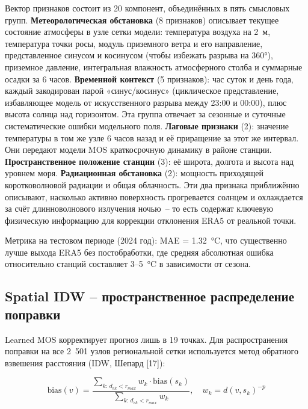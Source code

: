 \documentclass[14pt,a4paper]{extarticle}
\numberwithin{table}{section}
\numberwithin{figure}{section}
\numberwithin{equation}{section}
\begin{document}
Вектор признаков состоит из 20 компонент, объединённых в пять смысловых групп.
\textbf{Метеорологическая обстановка} (8 признаков) описывает текущее
состояние атмосферы в узле сетки модели: температура воздуха на 2~м,
температура точки росы, модуль приземного ветра и его направление,
представленное синусом и косинусом (чтобы избежать разрыва на 360°),
приземное давление, интегральная влажность атмосферного столба и
суммарные осадки за 6 часов.
\textbf{Временной контекст} (5 признаков): час суток и день года,
каждый закодирован парой «синус/косинус» (циклическое представление,
избавляющее модель от искусственного разрыва между 23:00 и 00:00),
плюс высота солнца над горизонтом. Эта группа отвечает за сезонные и
суточные систематические ошибки модельного поля.
\textbf{Лаговые признаки} (2): значение температуры в том же узле
6 часов назад и её приращение за этот же интервал. Они передают модели MOS
краткосрочную динамику в районе станции.
\textbf{Пространственное положение станции} (3): её широта, долгота и
высота над уровнем моря.
\textbf{Радиационная обстановка} (2): мощность приходящей коротковолновой
радиации и общая облачность. Эти два признака приближённо описывают,
насколько активно поверхность прогревается солнцем и охлаждается
за счёт длинноволнового излучения ночью~-- то есть содержат ключевую
физическую информацию для коррекции отклонения ERA5 от реальной точки.

Метрика на тестовом периоде (2024 год): MAE = 1.32~°C, что
существенно лучше выхода ERA5 без постобработки, где средняя
абсолютная ошибка относительно станций составляет 3--5~°C в зависимости
от сезона.

\subsection{Spatial IDW -- пространственное распределение поправки}\label{spatial-idw-ux43fux440ux43eux441ux442ux440ux430ux43dux441ux442ux432ux435ux43dux43dux43eux435-ux440ux430ux441ux43fux440ux435ux434ux435ux43bux435ux43dux438ux435-ux43fux43eux43fux440ux430ux432ux43aux438}

Learned MOS корректирует прогноз лишь в 19 точках. Для распространения
поправки на все 2~501 узлов региональной сетки используется метод
обратного взвешения расстояния (IDW, Шепард {[}17{]}):

\[\text{bias}(v) = \frac{\displaystyle\sum_{k:\, d_{vk} < r_{max}} w_k \cdot \text{bias}(s_k)}{\displaystyle\sum_{k:\, d_{vk} < r_{max}} w_k}, \quad w_k = d(v, s_k)^{-p}\]
\end{document}
